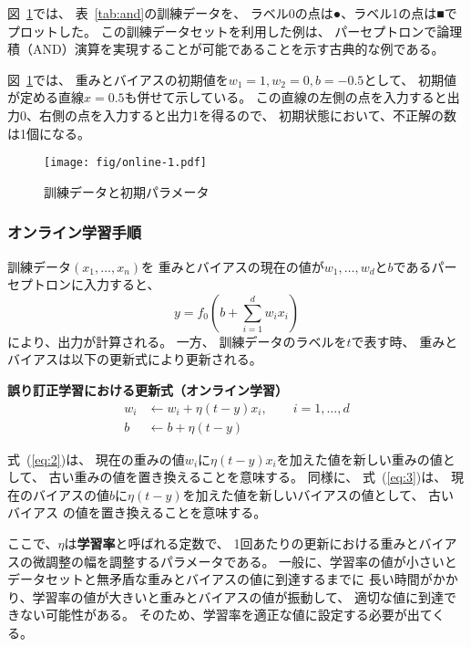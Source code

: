 図~\ref{fig:online-1}では、
表~\ref{tab:and}の訓練データを、
ラベル0の点は●、ラベル1の点は■でプロットした。
この訓練データセットを利用した例は、
パーセプトロンで論理積（AND）演算を実現することが可能であることを示す古典的な例である。

図~\ref{fig:online-1}では、
重みとバイアスの初期値を$w_1 = 1, w_2 = 0, b = -0.5$として、
初期値が定める直線$x = 0.5$も併せて示している。
この直線の左側の点を入力すると出力0、右側の点を入力すると出力1を得るので、
初期状態において、不正解の数は1個になる。

\begin{figure}
  \centering
  \texttt{[image: fig/online-1.pdf]}
  \caption{訓練データと初期パラメータ}
  \label{fig:online-1}
\end{figure}

\subsubsection{オンライン学習手順}
\label{sec:online-error-correction}

訓練データ$(x_1, \dots, x_n)$を
重みとバイアスの現在の値が$w_1, \dots, w_d$と$b$であるパーセプトロンに入力すると、
\[
  y = f_0\left(b + \sum_{i=1}^d w_ix_i\right)
\]
により、出力が計算される。
一方、
訓練データのラベルを$t$で表す時、
重みとバイアスは以下の更新式により更新される。

\begin{itembox}{\bf 誤り訂正学習における更新式（オンライン学習）}
  \begin{align}
    \label{eq:2}
    w_i & \leftarrow w_i + \eta (t - y) x_i,
    \qquad i = 1, \dots, d
    \\\label{eq:3}
    b & \leftarrow b + \eta (t - y)
  \end{align}
\end{itembox}


式~(\ref{eq:2})は、
現在の重みの値$w_i$に$\eta (t - y) x_i$を加えた値を新しい重みの値として、
古い重みの値を置き換えることを意味する。
同様に、
式~(\ref{eq:3})は、
現在のバイアスの値$b$に$\eta (t - y)$を加えた値を新しいバイアスの値として、
古いバイアス
の値を置き換えることを意味する。

ここで、$\eta$は\textbf{学習率}と呼ばれる定数で、
1回あたりの更新における重みとバイアスの微調整の幅を調整するパラメータである。
一般に、学習率の値が小さいとデータセットと無矛盾な重みとバイアスの値に到達するまでに
長い時間がかかり、学習率の値が大きいと重みとバイアスの値が振動して、
適切な値に到達できない可能性がある。
そのため、学習率を適正な値に設定する必要が出てくる。

